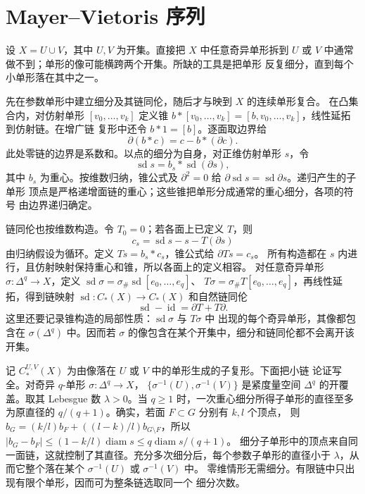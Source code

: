 \section{Mayer--Vietoris 序列}

设 $X=U\cup V$，其中 $U,V$ 为开集。直接把 $X$ 中任意奇异单形拆到
$U$ 或 $V$ 中通常做不到；单形的像可能横跨两个开集。所缺的工具是把单形
反复细分，直到每个小单形落在其中之一。

先在参数单形中建立细分及其链同伦，随后才与映到 $X$ 的连续单形复合。
在凸集合内，对仿射单形 $[v_0,\ldots,v_k]$ 定义锥
$b*[v_0,\ldots,v_k]=[b,v_0,\ldots,v_k]$，线性延拓到仿射链。在增广链
复形中还令 $b*1=[b]$。逐面取边界给
\[
 \partial(b*c)=c-b*(\partial c).
\]
此处零链的边界是系数和。以点的细分为自身，对正维仿射单形 $s$，令
\[
 \operatorname{sd}s=b_s*\operatorname{sd}(\partial s),
\]
其中 $b_s$ 为重心。按维数归纳，锥公式及 $\partial^2=0$ 给
$\partial\operatorname{sd}s=\operatorname{sd}\partial s$。递归产生的子单形
顶点是严格递增面链的重心；这些锥把单形分成通常的重心细分，各项的符号
由边界递归确定。

链同伦也按维数构造。令 $T_0=0$；若各面上已定义 $T$，则
\[
 c_s=\operatorname{sd}s-s-T(\partial s)
\]
由归纳假设为循环。定义 $Ts=b_s*c_s$，锥公式给 $\partial Ts=c_s$。
所有构造都在 $s$ 内进行，且仿射映射保持重心和锥，所以各面上的定义相容。
对任意奇异单形 $\sigma:\Delta^q\to X$，定义
$\operatorname{sd}\sigma=\sigma_\#\operatorname{sd}[e_0,\ldots,e_q]$、
$T\sigma=\sigma_\#T[e_0,\ldots,e_q]$，再线性延拓，得到链映射
$\operatorname{sd}:C_*(X)\to C_*(X)$ 和自然链同伦
\begin{equation}\label{eq:singular-subdivision-homotopy}
 \operatorname{sd}-\operatorname{id}=\partial T+T\partial.
\end{equation}
这里还要记录锥构造的局部性质：$\operatorname{sd}\sigma$ 与 $T\sigma$ 中
出现的每个奇异单形，其像都包含在 $\sigma(\Delta^q)$ 中。因而若 $\sigma$
的像包含在某个开集中，细分和链同伦都不会离开该开集。

记 $C_*^{U,V}(X)$ 为由像落在 $U$ 或 $V$ 中的单形生成的子复形。下面把小链
论证写全。对奇异 $q$-单形 $\sigma:\Delta^q\to X$，
$\{\sigma^{-1}(U),\sigma^{-1}(V)\}$ 是紧度量空间 $\Delta^q$ 的开覆盖。取其
Lebesgue 数 $\lambda>0$。当 $q\geq1$ 时，一次重心细分所得子单形的直径至多
为原直径的 $q/(q+1)$。确实，若面 $F\subset G$ 分别有 $k,l$ 个顶点，
则 $b_G=(k/l)b_F+((l-k)/l)b_{G\setminus F}$，所以
$|b_G-b_F|\le(1-k/l)\operatorname{diam}s\le q\operatorname{diam}s/(q+1)$。
细分子单形中的顶点来自同一面链，这就控制了其直径。充分多次细分后，每个参数子单形的直径小于
$\lambda$，从而它整个落在某个 $\sigma^{-1}(U)$ 或 $\sigma^{-1}(V)$ 中。
零维情形无需细分。有限链中只出现有限个单形，因而可为整条链选取同一个
细分次数。

